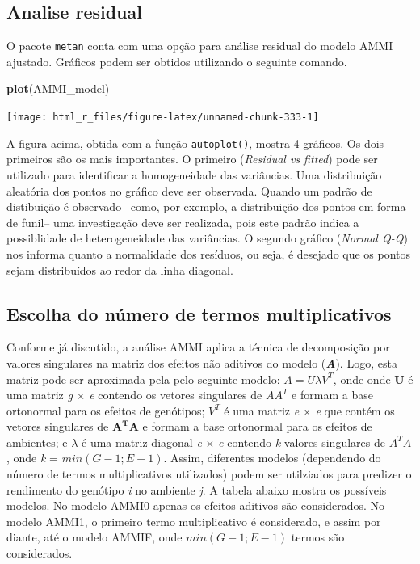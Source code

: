 \documentclass[
]{book}
\newenvironment{Shaded}{\begin{snugshade}}{\end{snugshade}}
\newcommand{\KeywordTok}[1]{\textcolor[rgb]{0.13,0.29,0.53}{\textbf{#1}}}
\newcommand{\NormalTok}[1]{#1}
\begin{document}
\hypertarget{analise-residual}{%
\subsection{Analise residual}\label{analise-residual}}

O pacote \texttt{metan} conta com uma opção para análise residual do modelo AMMI ajustado. Gráficos podem ser obtidos utilizando o seguinte comando.

\begin{Shaded}
\begin{Highlighting}[]
\KeywordTok{plot}\NormalTok{(AMMI_model)}
\end{Highlighting}
\end{Shaded}

\begin{center}\texttt{[image: html\_r\_files/figure-latex/unnamed-chunk-333-1]} \end{center}

A figura acima, obtida com a função \texttt{autoplot()}, mostra 4 gráficos. Os dois primeiros são os mais importantes. O primeiro (\emph{Residual vs fitted}) pode ser utilizado para identificar a homogeneidade das variâncias. Uma distribuição aleatória dos pontos no gráfico deve ser observada. Quando um padrão de distibuição é observado --como, por exemplo, a distribuição dos pontos em forma de funil-- uma investigação deve ser realizada, pois este padrão indica a possiblidade de heterogeneidade das variâncias. O segundo gráfico (\emph{Normal Q-Q}) nos informa quanto a normalidade dos resíduos, ou seja, é desejado que os pontos sejam distribuídos ao redor da linha diagonal.

\hypertarget{escolha-do-nuxfamero-de-termos-multiplicativos}{%
\subsection{Escolha do número de termos multiplicativos}\label{escolha-do-nuxfamero-de-termos-multiplicativos}}

Conforme já discutido, a análise AMMI aplica a técnica de decomposição por valores singulares na matriz dos efeitos não aditivos do modelo (\textbf{\emph{A}}). Logo, esta matriz pode ser aproximada pela pelo seguinte modelo: \(A = U \lambda V^T\), onde onde \textbf{U} é uma matriz \emph{g} \(\times\) \emph{e} contendo os vetores singulares de \(AA^T\) e formam a base ortonormal para os efeitos de genótipos; \(V^T\) é uma matriz \emph{e} \(\times\) \emph{e} que contém os vetores singulares de \(\mathbf{A^TA}\) e formam a base ortonormal para os efeitos de ambientes; e \(\lambda\) é uma matriz diagonal \emph{e} \(\times\) \emph{e} contendo \emph{k}-valores singulares de \(A^TA\) , onde \emph{k} = \(min(G-1; E-1)\). Assim, diferentes modelos (dependendo do número de termos multiplicativos utilizados) podem ser utilziados para predizer o rendimento do genótipo \emph{i} no ambiente \emph{j}. A tabela abaixo mostra os possíveis modelos. No modelo AMMI0 apenas os efeitos aditivos são considerados. No modelo AMMI1, o primeiro termo multiplicativo é considerado, e assim por diante, até o modelo AMMIF, onde \(min(G-1;E-1)\) termos são considerados.
\end{document}
